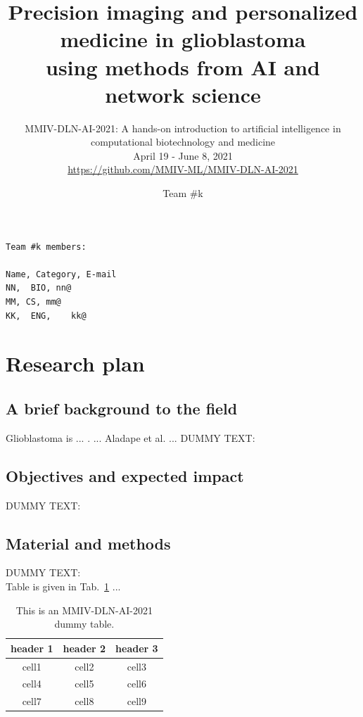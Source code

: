 \documentclass[11pt]{article}
\title{Precision imaging and personalized medicine in glioblastoma \\ {\Large using methods from AI and network science}}
\author{{\small MMIV-DLN-AI-2021: A hands-on introduction to artificial intelligence in computational biotechnology and medicine}\\ {\small April 19 -  June 8, 2021}\\
{\footnotesize \url{https://github.com/MMIV-ML/MMIV-DLN-AI-2021}}}
\date{Team \#k}
\begin{document}
\maketitle

\begin{scriptsize}
\begin{verbatim}
Team #k members:

Name, Category, E-mail	
NN,  BIO, nn@
MM, CS, mm@
KK,  ENG,	 kk@

\end{verbatim}
\end{scriptsize}

\vspace{3mm}
\section{Research plan} %

\vspace{3mm}

\subsection{A brief background to the field}

Glioblastoma is ...  \cite{Louis2019}. ...  Aladape et al. \cite{Aldape2019} ... 
DUMMY TEXT:
\lipsum[5]

\subsection{Objectives and expected impact}

DUMMY TEXT:
\lipsum[5]


\subsection{Material and methods}

DUMMY TEXT:
\lipsum[6] \\

Table is given in Tab.~\ref{tab:mmiv-dln-ai-2021-dummy} ...

\begin{table}[H]
\begin{center}
\begin{tabular}{ |c|c|c| } 
 \hline
 header 1 & header 2 & header 3 \\ 
 \hline
 cell1 & cell2 & cell3 \\ 
 cell4 & cell5 & cell6 \\ 
 cell7 & cell8 & cell9 \\ 
 \hline
\end{tabular}
\end{center}
\caption{This is an MMIV-DLN-AI-2021 dummy table.}
\label{tab:mmiv-dln-ai-2021-dummy}
\end{table}
\end{document}

